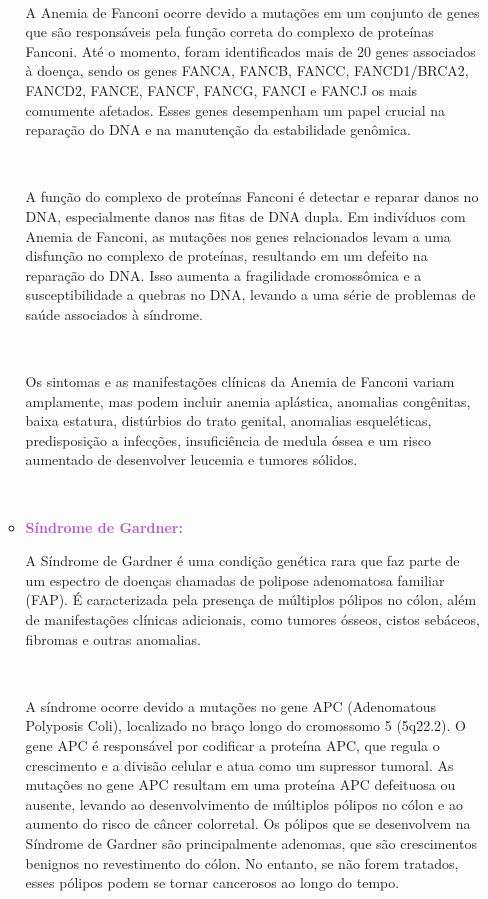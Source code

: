 \documentclass[11pt,a4paper]{article}
\begin{document}
\begin{itemize}[label=\textcolor{CarnationPink}{$\blacktriangleright$}]
\begin{itemize}[label=\textcolor{CarnationPink}{$\star$}]
			\

			A Anemia de Fanconi ocorre devido a mutações em um conjunto de genes que são responsáveis pela função correta do complexo de proteínas Fanconi. Até o momento, foram identificados mais de 20 genes associados à doença, sendo os genes FANCA, FANCB, FANCC, FANCD1/BRCA2, FANCD2, FANCE, FANCF, FANCG, FANCI e FANCJ os mais comumente afetados. Esses genes desempenham um papel crucial na reparação do DNA e na manutenção da estabilidade genômica.

			\

			A função do complexo de proteínas Fanconi é detectar e reparar danos no DNA, especialmente danos nas fitas de DNA dupla. Em indivíduos com Anemia de Fanconi, as mutações nos genes relacionados levam a uma disfunção no complexo de proteínas, resultando em um defeito na reparação do DNA. Isso aumenta a fragilidade cromossômica e a susceptibilidade a quebras no DNA, levando a uma série de problemas de saúde associados à síndrome.

			\

			Os sintomas e as manifestações clínicas da Anemia de Fanconi variam amplamente, mas podem incluir anemia aplástica, anomalias congênitas, baixa estatura, distúrbios do trato genital, anomalias esqueléticas, predisposição a infecções, insuficiência de medula óssea e um risco aumentado de desenvolver leucemia e tumores sólidos.

			\

			\item \textcolor{MediumOrchid}{\large\textbf{Síndrome de Gardner:}}
			
			A Síndrome de Gardner é uma condição genética rara que faz parte de um espectro de doenças chamadas de polipose adenomatosa familiar (FAP). É caracterizada pela presença de múltiplos pólipos no cólon, além de manifestações clínicas adicionais, como tumores ósseos, cistos sebáceos, fibromas e outras anomalias.

			\

			A síndrome ocorre devido a mutações no gene APC (Adenomatous Polyposis Coli), localizado no braço longo do cromossomo 5 (5q22.2). O gene APC é responsável por codificar a proteína APC, que regula o crescimento e a divisão celular e atua como um supressor tumoral. As mutações no gene APC resultam em uma proteína APC defeituosa ou ausente, levando ao desenvolvimento de múltiplos pólipos no cólon e ao aumento do risco de câncer colorretal. Os pólipos que se desenvolvem na Síndrome de Gardner são principalmente adenomas, que são crescimentos benignos no revestimento do cólon. No entanto, se não forem tratados, esses pólipos podem se tornar cancerosos ao longo do tempo. 


\end{itemize}
\end{itemize}
\end{document}
